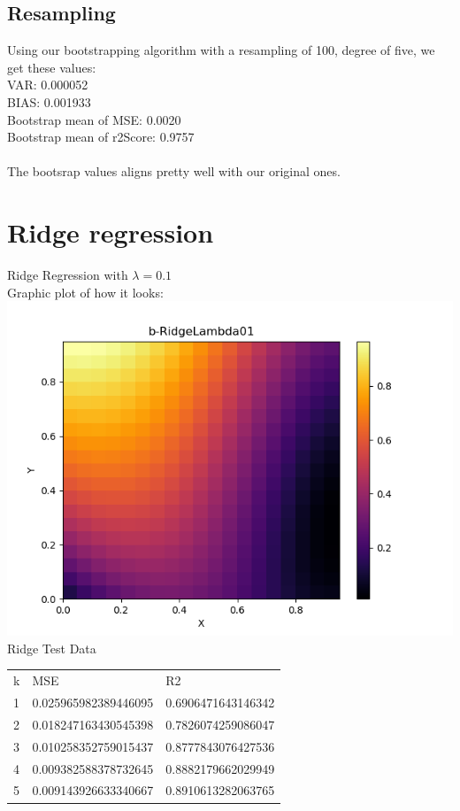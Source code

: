 \documentclass[a4paper,norsk]{article}
\begin{document}
\subsection*{Resampling}
Using our bootstrapping algorithm with a resampling of 100, degree of five, we get these values:
\\VAR: 0.000052
\\BIAS: 0.001933
\\Bootstrap mean of MSE: 0.0020
\\Bootstrap mean of r2Score: 0.9757
\\ 
\\The bootsrap values aligns pretty well with our original ones.
\clearpage
\section*{Ridge regression}
Ridge Regression with $\lambda = 0.1$
\\Graphic plot of how it looks:
\\ \includegraphics[scale=.7]{b-RidgeLambda01}
\\Ridge Test Data
\begin{table}[!h]
\begin{tabular}{lll}
k & MSE                   & R2                 \\
1 & 0.025965982389446095  & 0.6906471643146342 \\
2 & 0.018247163430545398  & 0.7826074259086047 \\
3 & 0.010258352759015437  & 0.8777843076427536 \\
4 & 0.009382588378732645  & 0.8882179662029949 \\
5 & 0.009143926633340667 & 0.8910613282063765
\end{tabular}
\end{table}
\end{document}
